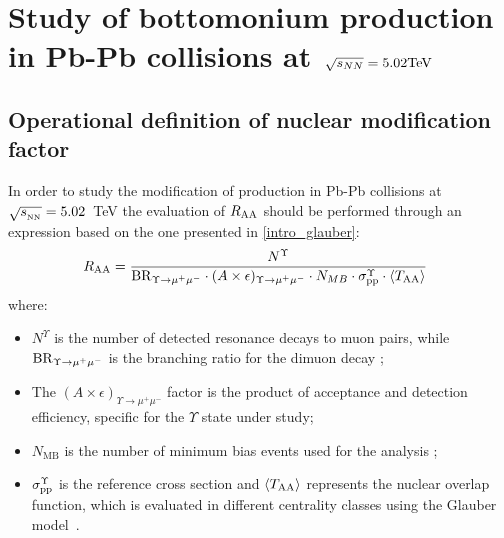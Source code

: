 
\chapter{Study of bottomonium production in Pb-Pb collisions at$\ $ \texorpdfstring{$\sqrt[]{s_{NN}}=5.02 \rm{TeV}$}{sqrt(Snn)=5.02\ \rm{TeV}}}

\section{Operational definition of nuclear modification factor}
In order to study the modification of \upsi production in Pb-Pb collisions at $\sqrt{s_{_{\rm NN}}}=5.02$~\rm{TeV} the evaluation of $R_{\rm AA}$ should be performed through an expression based on the one presented in \ref{intro_glauber}:
\begin{equation} \label{eqn:raa}
R_{\rm{AA}} = \frac{N^{\Upsilon}}{ {\rm BR}_{\Upsilon \rightarrow \mu^{+} \mu^{-}} \cdot  (A\times\epsilon)_{\Upsilon \rightarrow \mu^{+} \mu^{-}} \cdot  N_{MB} \cdot \sigma_{\rm pp}^{\Upsilon} \cdot \langle T_{\rm AA} \rangle } ~~
\end{equation}
where:
\begin{itemize}
\item $N^{\Upsilon}$ is the number of detected resonance decays to muon pairs, while ${\rm BR}_{\Upsilon \rightarrow \mu^{+} \mu^{-}}$ is the branching ratio for the dimuon decay \cite{Agashe:2014kda};
\item The $(A\times\epsilon)_{\Upsilon \rightarrow \mu^{+} \mu^{-}}$ factor is the product of acceptance and detection efficiency, specific for the $\Upsilon$ state under study;
\item $N_{\text{MB}}$ is the number of minimum bias events used for the analysis ;
\item $\sigma_{\rm pp}^{\Upsilon}$ is the reference \pp cross section and $\langle T_{\rm AA} \rangle$ represents the nuclear overlap function, which is evaluated in different centrality classes using the Glauber model~\cite{Abelev:2013qoq,Adam:2015ptt}.
\end{itemize}

